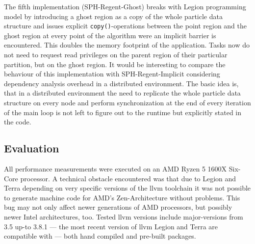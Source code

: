 \documentclass{article}      %
\begin{document}
The fifth implementation (SPH-Regent-Ghost) breaks with Legion programming model by introducing a ghost region as a copy of the whole particle data structure and issues explicit \lstinline{copy()}-operations between the point region and the ghost region at every point of the algorithm were an implicit barrier is encountered. 
This doubles the memory footprint of the application. 
Tasks now do not need to request read privileges on the parent region of their particular partition, but on the ghost region. It would be interesting to compare the behaviour of this implementation with SPH-Regent-Implicit considering dependency analysis overhead in a distributed environment. The basic idea is, that in a distributed environment the need to replicate the whole particle data structure on every node and perform synchronization at the end of every iteration of the main loop is not left to figure out to the runtime but explicitly stated in the code. 

\subsection{Evaluation}
All performance measurements were executed on an AMD Ryzen 5 1600X Six-Core processor.
A technical obstacle encountered was that due to Legion and Terra depending on very specific versions of the llvm toolchain it was not possible to generate machine code for AMD's Zen-Architecture without problems. This bug may not only affect newer generations of AMD processors, but possibly newer Intel architectures, too. Tested llvm versions include major-versions from 3.5 up-to 3.8.1 --- the most recent version of llvm Legion and Terra are compatible with --- both hand compiled and pre-built packages.
\end{document}
